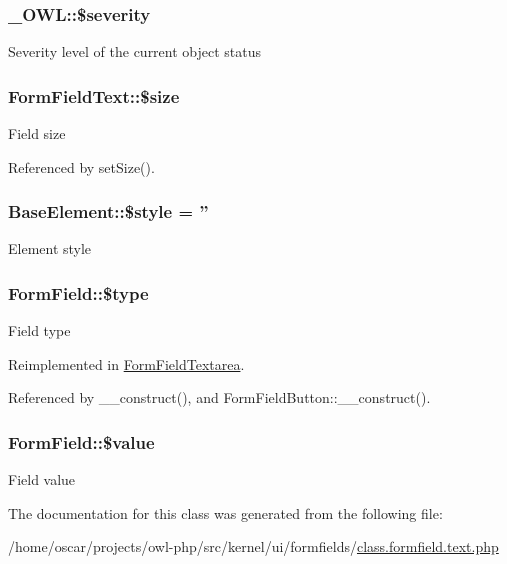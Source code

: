 \subsubsection[{\$severity}]{\setlength{\rightskip}{0pt plus 5cm}\_\-OWL::\$severity}\label{class__OWL_ad26b40a9dbbacb33e299b17826f8327c}
Severity level of the current object status 
\subsubsection[{\$size}]{\setlength{\rightskip}{0pt plus 5cm}FormFieldText::\$size}\label{classFormFieldText_a1db9cf2b51d60717eab0d295e97bcd5b}
Field size 

Referenced by setSize().

\subsubsection[{\$style}]{\setlength{\rightskip}{0pt plus 5cm}BaseElement::\$style = ''}\label{classBaseElement_a429a3d642dd95f30e1059ef29564b87d}
Element style 
\subsubsection[{\$type}]{\setlength{\rightskip}{0pt plus 5cm}FormField::\$type}\label{classFormField_a37bed21a1891e95be0e4a697e45ba51b}
Field type 

Reimplemented in \hyperlink{classFormFieldTextarea_a85348034822c70694fc8640bfcacc04d}{FormFieldTextarea}.



Referenced by \_\-\_\-construct(), and FormFieldButton::\_\-\_\-construct().

\subsubsection[{\$value}]{\setlength{\rightskip}{0pt plus 5cm}FormField::\$value}\label{classFormField_a3c01e89834248eec8e2f145fbcfa0fbc}
Field value 

The documentation for this class was generated from the following file:\begin{DoxyCompactItemize}
\item 
/home/oscar/projects/owl-\/php/src/kernel/ui/formfields/\hyperlink{class_8formfield_8text_8php}{class.formfield.text.php}\end{DoxyCompactItemize}
